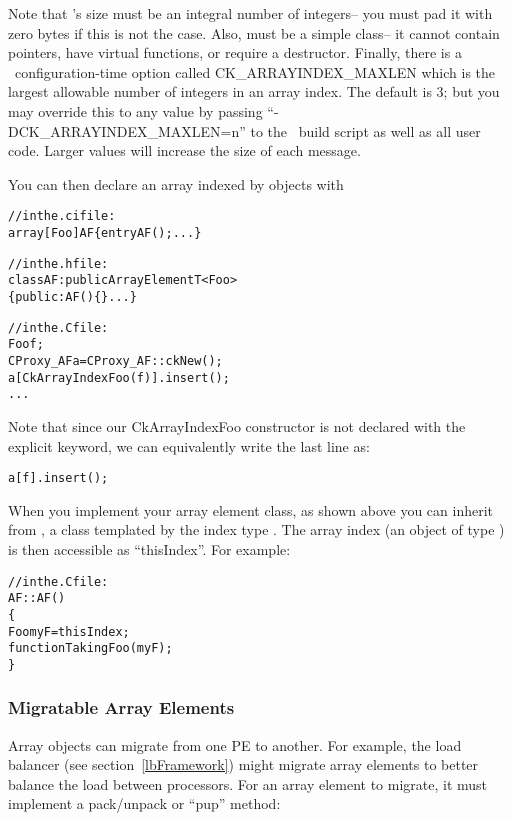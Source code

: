 Note that 's size must be an integral number of integers--
you must pad it with zero bytes if this is not the case.
Also,  must be a simple class-- it cannot contain 
pointers, have virtual functions, or require a destructor.
Finally, there is a \charmpp\ configuration-time option called
CK\_ARRAYINDEX\_MAXLEN  
which is the largest allowable number of 
integers in an array index.  The default is 3; but you may 
override this to any value by passing ``-DCK\_ARRAYINDEX\_MAXLEN=n'' 
to the \charmpp\ build script as well as all user code. Larger 
values will increase the size of each message.

You can then declare an array indexed by  objects with

\begin{alltt}
//in the .ci file:
array [Foo] AF \{ entry AF(); ... \}

//in the .h file:
class AF:public ArrayElementT<Foo>
\{ public: AF() \{\} ... \}

//in the .C file:
    Foo f;
    CProxy_AF a=CProxy_AF::ckNew();
    a[CkArrayIndexFoo(f)].insert();
    ...
\end{alltt}

Note that since our CkArrayIndexFoo constructor is not declared
with the explicit keyword, we can equivalently write the last line as:

\begin{alltt}
    a[f].insert();
\end{alltt}

When you implement your array element class, as shown above you 
can inherit from
, a class templated by the index type .
The array index (an object of type ) is then accessible as 
``thisIndex''. For example:

\begin{alltt}

//in the .C file:
AF::AF()
\{
    Foo myF=thisIndex;
    functionTakingFoo(myF);
\}
\end{alltt}


\subsubsection{Migratable Array Elements}
Array objects can migrate from one PE to another.
For example, the load balancer (see section~\ref{lbFramework})
might migrate array elements to better balance the load between
processors.  For an array element to migrate, it must implement
a pack/unpack or ``pup'' method:

